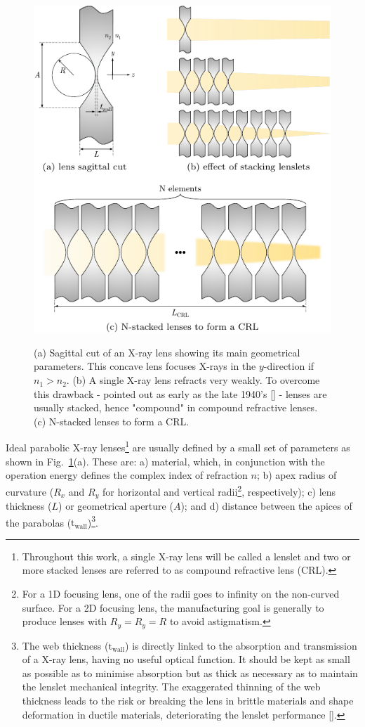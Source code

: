 \begin{refsection}
\begin{figure}[t]
    \centering
    {\includegraphics[width=0.5\linewidth]{figures/ch03/anatomy.pdf}}
    \caption[CRL anatomy]{(a) Sagittal cut of an X-ray lens showing its main geometrical parameters. This concave lens focuses X-rays in the $y$-direction if $n_1>n_2$. (b) A single X-ray lens refracts very weakly. To overcome this drawback - pointed out as early as the late 1940's [\cite{Kirkpatrick1948}] - lenses are usually stacked, hence "compound" in compound refractive lenses. (c) N-stacked lenses to form a CRL.}
    \label{fig:CRLs}
\end{figure}

Ideal parabolic X-ray lenses\footnote{Throughout this work, a single X-ray lens will be called a lenslet and two or more stacked lenses are referred to as compound refractive lens (CRL).} are usually defined by a small set of parameters as shown in Fig.~\ref{fig:CRLs}(a). These are: a) material, which, in conjunction with the operation energy defines the complex index of refraction $n$; b) apex radius of curvature ($R_x$ and $R_y$ for horizontal and vertical radii\footnote{For a 1D focusing lens, one of the radii goes to infinity on the non-curved surface. For a 2D focusing lens, the manufacturing goal is generally to produce lenses with $R_y=R_y=R$ to avoid astigmatism.}, respectively); c) lens thickness ($L$) or geometrical aperture ($A$); and d) distance between the apices of the parabolas ($\text{t}_{\text{wall}}$)\footnote{The web thickness ($\text{t}_{\text{wall}}$) is directly linked to the absorption and transmission of a X-ray lens, having no useful optical function. It should be kept as small as possible as to minimise absorption but as thick as necessary as to maintain the lenslet mechanical integrity. The exaggerated thinning of the web thickness leads to the risk or breaking the lens in brittle materials and shape deformation in ductile materials, deteriorating the lenslet performance [\cite{Lengeler1998}].}.


\end{refsection}
